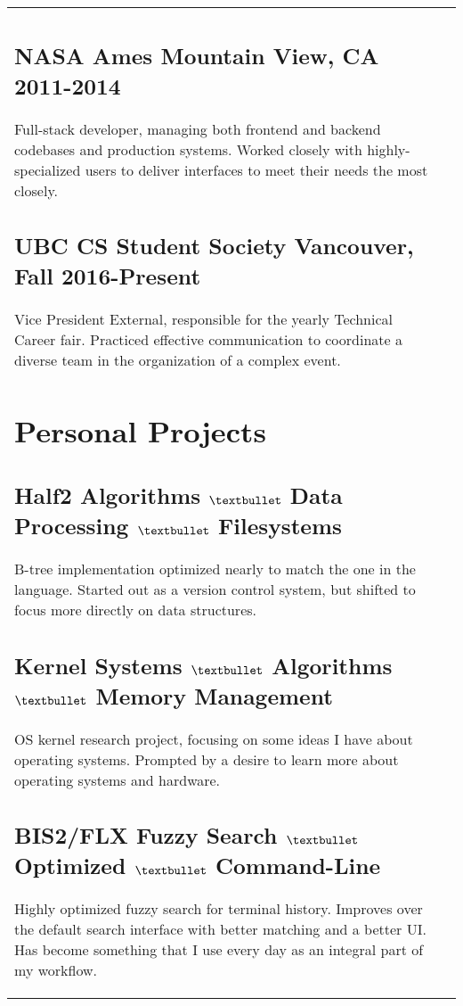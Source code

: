 \documentclass[letterpaper]{article}
\newlength{\leftcol}
\newlength{\rightcol}
\newcommand{\subtitle}{\normalfont\bodyfont\color{black}\large}
\begin{document}
\begin{tabularx}{\textwidth}{@{}p{\leftcol} p{\rightcol}}
\subsection*{NASA Ames \subtitle \hfill Mountain View, CA 2011-2014}

Full-stack developer, managing both frontend and backend codebases and
production systems. Worked closely with highly-specialized users to deliver
interfaces to meet their needs the most closely.

\subsection*{UBC CS Student Society \subtitle \hfill Vancouver, Fall 2016-Present}

Vice President External, responsible for the yearly Technical Career fair.
Practiced effective communication to coordinate a diverse team in the
organization of a complex event.

\vspace*{1pt}

\section*{Personal Projects}

\subsection*{Half2 \subtitle \hfill Algorithms $\textbullet$ Data Processing
  $\textbullet$ Filesystems }

B-tree implementation optimized nearly to match the one in the language. Started
out as a version control system, but shifted to focus more directly on data
structures.

\subsection*{Kernel \subtitle \hfill Systems $\textbullet$ Algorithms
  $\textbullet$ Memory Management}

OS kernel research project, focusing on some ideas I have about operating
systems. Prompted by a desire to learn more about operating systems and
hardware.

\subsection*{BIS2/FLX \subtitle \hfill Fuzzy Search $\textbullet$ Optimized
  $\textbullet$ Command-Line}

Highly optimized fuzzy search for terminal history. Improves over the default
search interface with better matching and a better UI. Has become something that
I use every day as an integral part of my workflow.
\end{tabularx}
\end{document}
